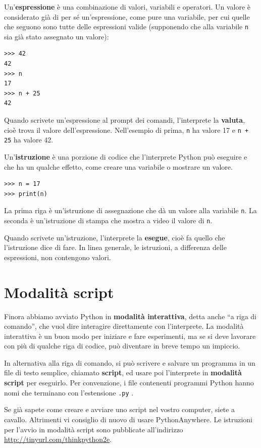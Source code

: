 \documentclass[10pt]{book}
\begin{document}
Un'{\bf espressione} è una combinazione di valori, variabili e operatori. Un valore è considerato già di per sé un'espressione, come pure una variabile, per cui quelle che seguono sono tutte delle espressioni valide (supponendo che alla variabile {\tt n} sia già stato assegnato un valore):

\begin{verbatim}
>>> 42
42
>>> n
17
>>> n + 25
42
\end{verbatim}
%

Quando scrivete un'espressione al prompt dei comandi, l'interprete la
{\bf valuta}, cioè trova il valore dell'espressione. 
Nell'esempio di prima, {\tt n} ha valore 17 e {\tt n + 25} ha valore 42.

Un'{\bf istruzione} è una porzione di codice che l'interprete Python può eseguire e che ha un qualche effetto, come creare una variabile o mostrare un valore.

\begin{verbatim}
>>> n = 17
>>> print(n)
\end{verbatim}
%
La prima riga è un'istruzione di assegnazione che dà un valore alla variabile {\tt n}.  La seconda è un'istruzione di stampa che mostra a video il valore di {\tt n}.

Quando scrivete un'istruzione, l'interprete la {\bf esegue}, cioè fa quello che l'istruzione dice di fare. In linea generale, le istruzioni, a differenza delle espressioni, non contengono valori.


\section{Modalità script}

Finora abbiamo avviato Python in {\bf modalità interattiva}, detta anche ``a riga di comando'', che vuol dire interagire direttamente con l'interprete. La modalità interattiva è un buon modo per iniziare e fare esperimenti, ma se si deve lavorare con più di qualche riga di codice, può diventare in breve tempo un impiccio.

In alternativa alla riga di comando, si può scrivere e salvare un programma in un file di testo semplice, chiamato {\bf script}, ed usare poi l'interprete in {\bf modalità script} per eseguirlo. Per convenzione, i file contenenti programmi Python hanno nomi che terminano con l'estensione {\tt .py} .

Se già sapete come creare e avviare uno script nel vostro computer, siete a cavallo. Altrimenti vi consiglio di nuovo di usare PythonAnywhere. Le istruzioni per l'avvio in modalità script sono pubblicate all'indirizzo
\url{http://tinyurl.com/thinkpython2e}.
\end{document}
